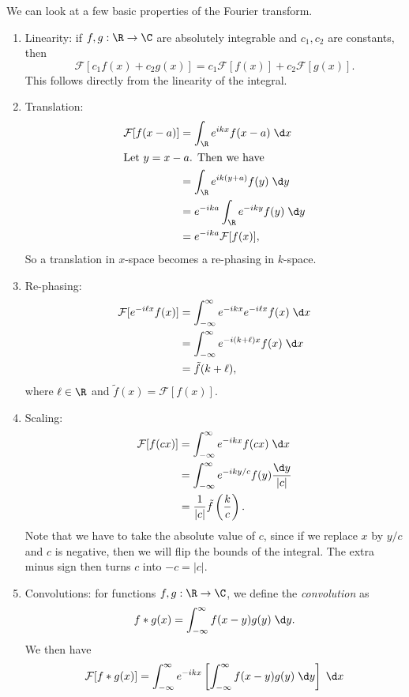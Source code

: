 \documentclass[a4paper]{article}
\begin{document}
We can look at a few basic properties of the Fourier transform.
\begin{enumerate}
  \item Linearity: if $f, g: \R \to \C$ are absolutely integrable and $c_1, c_2$ are constants, then
    \[
      \mathcal{F}[c_1 f(x) + c_2 g(x)] = c_1 \mathcal{F}[f(x)] + c_2 \mathcal{F}[g(x)].
    \]
    This follows directly from the linearity of the integral.
  \item Translation:
    \begin{align*}
      \mathcal{F}[f(x - a)] &= \int_{\R}e^{ikx} f(x - a)\;\d x \\
      \intertext{Let $y = x - a$. Then we have}
      &= \int_{\R} e^{ik(y + a)}f (y) \;\d y \\
      &= e^{-ika} \int_{\R} e^{-iky}f(y)\;\d y \\
      &= e^{-ika}\mathcal{F}[f(x)],
    \end{align*}
    So a translation in $x$-space becomes a re-phasing in $k$-space.
  \item Re-phasing:
    \begin{align*}
      \mathcal{F}[e^{-i\ell x}f(x)] &= \int_{-\infty}^\infty e^{-ikx} e^{-i\ell x} f(x)\;\d x\\
      &= \int_{-\infty}^\infty e^{-i(k + \ell)x} f(x)\;\d x\\
      &= \tilde{f}(k + \ell),
    \end{align*}
    where $\ell \in \R$ and $\tilde{f}(x) = \mathcal{F}[f(x)]$.
  \item Scaling:
    \begin{align*}
      \mathcal{F}[f(cx)] &= \int_{-\infty}^\infty e^{-ikx}f(cx)\;\d x\\
      &= \int_{-\infty}^\infty e^{-iky/c} f(y) \frac{\d y}{|c|}\\
      &= \frac{1}{|c|} \tilde{f}\left(\frac{k}{c}\right).
    \end{align*}
    Note that we have to take the absolute value of $c$, since if we replace $x$ by $y/c$ and $c$ is negative, then we will flip the bounds of the integral. The extra minus sign then turns $c$ into $-c = |c|$.
  \item Convolutions: for functions $f, g: \R \to \C$, we define the \emph{convolution} as
    \[
      f * g (x) = \int_{-\infty}^\infty f(x - y) g(y)\;\d y.
    \]
    We then have
    \begin{align*}
      \mathcal{F}[f * g(x)] &= \int_{-\infty}^\infty e^{-ikx} \left[\int_{-\infty}^{\infty} f(x - y)g(y) \;\d y\right] \;\d x\\

\end{align*}
\end{enumerate}
\end{document}

